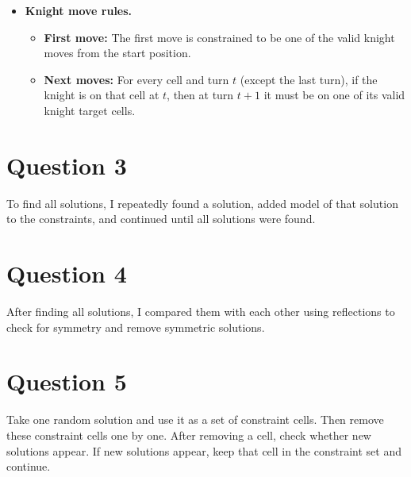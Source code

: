 \documentclass[a4paper, 11pt, oneside]{article}
\begin{document}
\begin{enumerate}
\begin{itemize}
    \item \textbf{Knight move rules.}
    \begin{itemize}
        \item \textbf{First move:}
        The first move is constrained to be one of the valid knight moves from the start position.
        \item \textbf{Next moves:}
        For every cell and turn $t$ (except the last turn), if the knight is on that cell at $t$,
        then at turn $t+1$ it must be on one of its valid knight target cells.
    \end{itemize}
\end{itemize}
\end{enumerate}

\section{Question 3}
To find all solutions, I repeatedly found a solution, added model of that solution to the constraints, and continued until all solutions were found.

\section{Question 4}
After finding all solutions, I compared them with each other using reflections to check for symmetry and remove symmetric solutions.

\section{Question 5}
Take one random solution and use it as a set of constraint cells.
Then remove these constraint cells one by one. After removing a cell, check whether new solutions appear.
If new solutions appear, keep that cell in the constraint set and continue.
\end{document}
